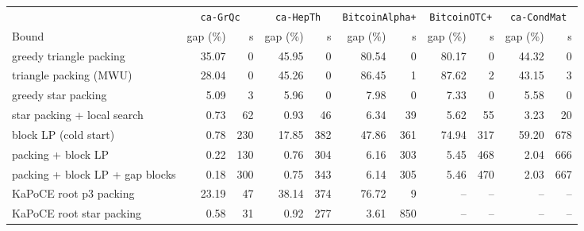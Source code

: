 \begin{tabular}{lrrrrrrrrrr}
\toprule
 & \multicolumn{2}{c}{\texttt{ca-GrQc}} & \multicolumn{2}{c}{\texttt{ca-HepTh}} & \multicolumn{2}{c}{\texttt{BitcoinAlpha+}} & \multicolumn{2}{c}{\texttt{BitcoinOTC+}} & \multicolumn{2}{c}{\texttt{ca-CondMat}}\\
Bound & gap (\%) & s & gap (\%) & s & gap (\%) & s & gap (\%) & s & gap (\%) & s\\
\midrule
greedy triangle packing & 35.07 & 0 & 45.95 & 0 & 80.54 & 0 & 80.17 & 0 & 44.32 & 0\\
triangle packing (MWU) & 28.04 & 0 & 45.26 & 0 & 86.45 & 1 & 87.62 & 2 & 43.15 & 3\\
greedy star packing & 5.09 & 3 & 5.96 & 0 & 7.98 & 0 & 7.33 & 0 & 5.58 & 0\\
star packing + local search & 0.73 & 62 & 0.93 & 46 & 6.34 & 39 & 5.62 & 55 & 3.23 & 20\\
block LP (cold start) & 0.78 & 230 & 17.85 & 382 & 47.86 & 361 & 74.94 & 317 & 59.20 & 678\\
packing + block LP & 0.22 & 130 & 0.76 & 304 & 6.16 & 303 & 5.45 & 468 & 2.04 & 666\\
packing + block LP + gap blocks & 0.18 & 300 & 0.75 & 343 & 6.14 & 305 & 5.46 & 470 & 2.03 & 667\\
KaPoCE root p3 packing & 23.19 & 47 & 38.14 & 374 & 76.72 & 9 & -- & -- & -- & --\\
KaPoCE root star packing & 0.58 & 31 & 0.92 & 277 & 3.61 & 850 & -- & -- & -- & --\\
\bottomrule
\end{tabular}
